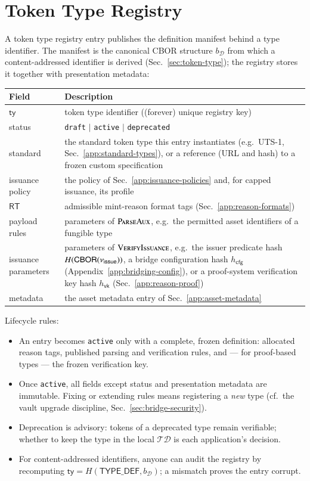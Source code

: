 \section{Token Type Registry}\label{app:type-registry}

A token type registry entry publishes the definition manifest behind a type identifier. The manifest is the canonical CBOR structure $b_\mathcal{D}$ from which a content-addressed identifier is derived (Sec.~\ref{sec:token-type}); the registry stores it together with presentation metadata:

\begin{longtable}{lp{9.6cm}}
\textbf{Field} & \textbf{Description} \\
\hline
\endhead
$\mathsf{ty}$ & token type identifier ((forever) unique registry key) \\
status & \texttt{draft} $\mid$ \texttt{active} $\mid$ \texttt{deprecated} \\
standard & the standard token type this entry instantiates (e.g.\ UTS-1, Sec.~\ref{app:standard-types}), or a reference (URL and hash) to a frozen custom specification \\
issuance policy & the policy of Sec.~\ref{app:issuance-policies} and, for capped issuance, its profile \\
$\mathsf{RT}$ & admissible mint-reason format tags (Sec.~\ref{app:reason-formats}) \\
payload rules & parameters of $\Call{ParseAux}{}$, e.g.\ the permitted asset identifiers of a fungible type \\
issuance parameters & parameters of $\Call{VerifyIssuance}{}$, e.g.\ the issuer predicate hash $H(\mathsf{CBOR}(\nu_\mathsf{issue}))$, a bridge configuration hash $h_\mathsf{cfg}$ (Appendix~\ref{app:bridging-config}), or a proof-system verification key hash $h_\mathsf{vk}$ (Sec.~\ref{app:reason-proof}) \\
metadata & the asset metadata entry of Sec.~\ref{app:asset-metadata} \\
\end{longtable}

Lifecycle rules:
\begin{itemize}
	\item An entry becomes \texttt{active} only with a complete, frozen definition: allocated reason tags, published parsing and verification rules, and --- for proof-based types --- the frozen verification key.
	\item Once \texttt{active}, all fields except status and presentation metadata are immutable. Fixing or extending rules means registering a \emph{new} type (cf.\ the vault upgrade discipline, Sec.~\ref{sec:bridge-security}).
	\item Deprecation is advisory: tokens of a deprecated type remain verifiable; whether to keep the type in the local $\mathcal{TD}$ is each application's decision.
	\item For content-addressed identifiers, anyone can audit the registry by recomputing $\mathsf{ty} = H(\mathsf{TYPE\_DEF}, b_\mathcal{D})$; a mismatch proves the entry corrupt.
\end{itemize}

